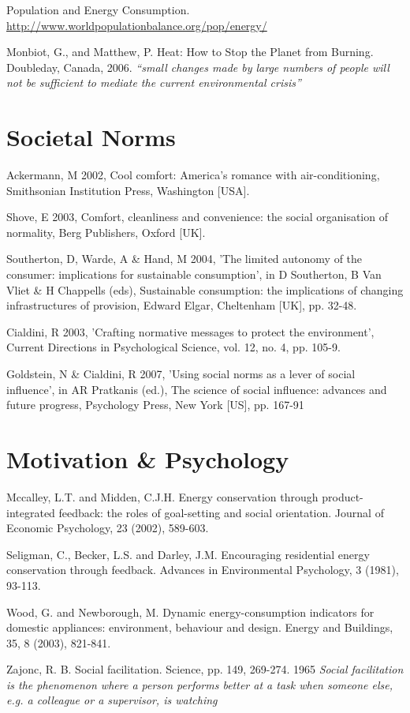 Population and Energy Consumption. \url{http://www.worldpopulationbalance.org/pop/energy/}

Monbiot, G., and Matthew, P.  Heat: How to Stop the Planet from Burning.  Doubleday, Canada, 2006. \emph{``small changes made by large numbers of people will not be sufficient to mediate the current environmental crisis''}


\section{Societal Norms}
Ackermann, M 2002, Cool comfort: America's romance with air-conditioning, Smithsonian Institution Press, Washington [USA].

Shove, E 2003, Comfort, cleanliness and convenience: the social organisation of normality, Berg Publishers, Oxford [UK].

Southerton, D, Warde, A \& Hand, M 2004, 'The limited autonomy of the consumer: implications for sustainable consumption', in D Southerton, B Van Vliet \& H Chappells (eds), Sustainable consumption: the implications of changing infrastructures of provision, Edward Elgar, Cheltenham [UK], pp. 32-48.

Cialdini, R 2003, 'Crafting normative messages to protect the environment', Current Directions in Psychological Science, vol. 12, no. 4, pp. 105-9.

Goldstein, N \& Cialdini, R 2007, 'Using social norms as a lever of social influence', in AR Pratkanis (ed.), The science of social influence: advances and future progress, Psychology Press, New York [US], pp. 167-91


\section{Motivation \& Psychology}
Mccalley, L.T. and Midden, C.J.H. Energy conservation through product-integrated feedback: the roles of goal-setting and social orientation. Journal of Economic Psychology, 23 (2002), 589-603.

Seligman, C., Becker, L.S. and Darley, J.M. Encouraging residential energy conservation through feedback. Advances in Environmental Psychology, 3 (1981), 93-113.

Wood, G. and Newborough, M. Dynamic energy-consumption indicators for domestic appliances: environment, behaviour and design. Energy and Buildings, 35, 8 (2003), 821-841.

Zajonc, R. B. Social facilitation. Science, pp. 149, 269-274. 1965 \emph{Social facilitation is the phenomenon where a person performs better at a task when someone else, e.g. a colleague or a supervisor, is watching}

